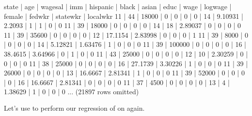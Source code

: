\documentclass[letterpaper,10pt,english]{jupyterBook}
\begin{document}
\begin{sphinxVerbatim}[commandchars=\\\{\}]
state | age  | wagesal | imm  | hispanic | black | asian | educ | wage    | logwage | female | fedwkr | statewkr | localwkr
11    | 44   | 18000   | 0    | 0        | 0     | 0     | 14   | 9.10931 | 2.2093  | 1      | 1      | 0        | 0
11    | 39   | 18000   | 0    | 0        | 0     | 0     | 14   | 18      | 2.89037 | 0      | 0      | 0        | 0
11    | 39   | 35600   | 0    | 0        | 0     | 0     | 12   | 17.1154 | 2.83998 | 0      | 0      | 0        | 1
11    | 39   | 8000    | 0    | 0        | 0     | 0     | 14   | 5.12821 | 1.63476 | 1      | 0      | 0        | 0
11    | 39   | 100000  | 0    | 0        | 0     | 0     | 16   | 38.4615 | 3.64966 | 0      | 1      | 0        | 0
11    | 43   | 25000   | 0    | 0        | 0     | 0     | 12   | 10      | 2.30259 | 0      | 0      | 0        | 0
11    | 38   | 25000   | 0    | 0        | 0     | 0     | 16   | 27.1739 | 3.30226 | 1      | 0      | 0        | 0
11    | 39   | 26000   | 0    | 0        | 0     | 0     | 13   | 16.6667 | 2.81341 | 1      | 0      | 0        | 0
11    | 39   | 52000   | 0    | 0        | 0     | 0     | 16   | 16.6667 | 2.81341 | 0      | 0      | 0        | 0
11    | 37   | 4500    | 0    | 0        | 0     | 0     | 13   | 4       | 1.38629 | 1      | 0      | 0        | 0
... (21897 rows omitted)
\end{sphinxVerbatim}

\sphinxAtStartPar
Let’s use  to perform our regression of  on  again.

\begin{sphinxVerbatim}[commandchars=\\\{\}]
  
  

   
  
\end{sphinxVerbatim}
\end{document}
